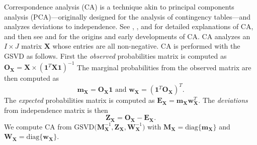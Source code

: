 \documentclass[12pt]{article}
\begin{document}
Correspondence analysis (CA) is a technique akin to principal components
analysis (PCA)---originally designed for the analysis of contingency
tables---and analyzes deviations to independence. See
\citet{greenacre_theory_1984}, \citet{greenacre_correspondence_2010-1},
and \citet{lebart_multivariate_1984} for detailed explanations of CA,
and then see \citet{escofier-cordier_analyse_1965} and
\citet{benzecri_analyse_1973} for the origins and early developments of
CA. CA analyzes an \(I \times J\) matrix \({\mathbf X}\) whose entries
are all non-negative. CA is performed with the GSVD as follows. First
the \emph{observed} probabilities matrix is computed as
\({\mathbf O}_{\mathbf X} = {\mathbf X} \times ({\mathbf 1}^{T}{\mathbf X} {\mathbf 1})^{-1}\)
The marginal probabilities from the observed matrix are then computed as
\begin{equation}
{\mathbf m}_{\mathbf X} = {\mathbf O}_{\mathbf X}{\mathbf 1} 
\text{ and } 
{\mathbf w}_{\mathbf X} = ({\mathbf 1}^{T}{\mathbf O}_{\mathbf X})^{T}.
\end{equation} The \emph{expected} probabilities matrix is computed as
\({\mathbf E}_{\mathbf X} = {\mathbf m}_{\mathbf X}{\mathbf w}_{\mathbf X}^{T}\).
The \emph{deviations} from independence matrix is then \begin{equation}
{\mathbf Z}_{\mathbf X} 
= {\mathbf O}_{\mathbf X} - {\mathbf E}_{\mathbf X}.
\end{equation} We compute CA from
\(\mathrm{GSVD(} {\mathbf M}_{\mathbf X}^{-1}, {\mathbf Z}_{\mathbf X}, {\mathbf W}_{\mathbf X}^{-1} \mathrm{)}\)
with
\({\mathbf M}_{\mathbf X} = \mathrm{diag\{} {\mathbf m}_{\mathbf X} \mathrm{\}}\)
and
\({\mathbf W}_{\mathbf X} = \mathrm{diag\{} {\mathbf w}_{\mathbf X} \mathrm{\}}\).
\end{document}
